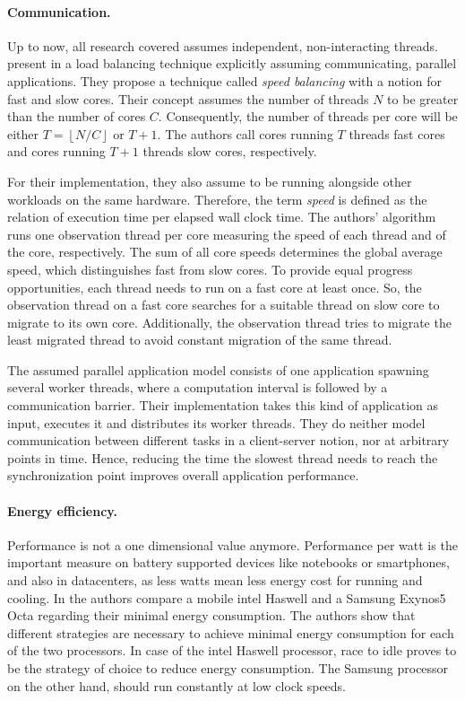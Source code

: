 \paragraph{Communication.}
Up to now, all research covered assumes independent, non-interacting threads.
\citeauthor{hofmeyr_load_2010} present in \cite{hofmeyr_load_2010} a load
balancing technique explicitly assuming communicating, parallel applications.
They propose a technique called \emph{speed balancing} with a notion for fast
and slow cores.
Their concept assumes the number of threads $N$ to be greater than the number of
cores $C$.
Consequently, the number of threads per core will be either
$T = \left \lfloor{N/C}\right \rfloor$ or $T+1$.
The authors call cores running $T$ threads fast cores and cores running $T+1$
threads slow cores, respectively.

For their implementation, they also assume to be running alongside other
workloads on the same hardware.
Therefore, the term \emph{speed} is defined as the relation of execution time per
elapsed wall clock time.
The authors' algorithm runs one observation thread per core measuring the speed
of each thread and of the core, respectively.
The sum of all core speeds determines the global average speed, which
distinguishes fast from slow cores.
To provide equal progress opportunities, each thread needs to run on a fast
core at least once.
So, the observation thread on a fast core searches for a suitable thread on slow
core to migrate to its own core.
Additionally, the observation thread tries to migrate the least migrated thread to
avoid constant migration of the same thread.

The assumed parallel application model consists of one application
spawning several worker threads, where a computation interval is followed by a
communication barrier.
Their implementation takes this kind of application as input, executes it and
distributes its worker threads.
They do neither model communication between different tasks in a client-server
notion, nor at arbitrary points in time.
Hence, reducing the time the slowest thread needs to reach the synchronization
point improves overall application performance.
\\

\paragraph{Energy efficiency.}
Performance is not a one dimensional value anymore.
Performance per watt is the important measure on battery supported devices like
notebooks or smartphones, and also in datacenters, as less watts mean less
energy cost for running and cooling.
In \cite{imes_poet_2015} the authors compare a mobile \gls{intel} Haswell and a
Samsung Exynos5 Octa regarding their minimal energy consumption.
The authors show that different strategies are necessary to achieve minimal
energy consumption for each of the two processors.
In case of the \gls{intel} Haswell processor, race to idle proves to be the
strategy of choice to reduce energy consumption.
The Samsung processor on the other hand, should run constantly at low clock
speeds.

